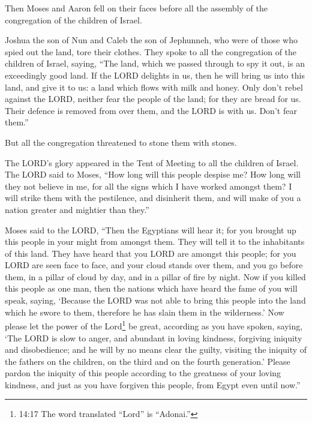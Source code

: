  Then Moses and Aaron fell on their faces before all the
assembly of the congregation of the children of Israel.

 Joshua the son of Nun and Caleb the son of Jephunneh, who
were of those who spied out the land, tore their clothes. 
They spoke to all the congregation of the children of Israel, saying,
``The land, which we passed through to spy it out, is an exceedingly
good land.  If the LORD delights in us, then he will bring
us into this land, and give it to us: a land which flows with milk and
honey.  Only don't rebel against the LORD, neither fear the
people of the land; for they are bread for us. Their defence is removed
from over them, and the LORD is with us. Don't fear them.''

 But all the congregation threatened to stone them with
stones.

The LORD's glory appeared in the Tent of Meeting to all the children of
Israel.  The LORD said to Moses, ``How long will this
people despise me? How long will they not believe in me, for all the
signs which I have worked amongst them?  I will strike them
with the pestilence, and disinherit them, and will make of you a nation
greater and mightier than they.''

 Moses said to the LORD, ``Then the Egyptians will hear it;
for you brought up this people in your might from amongst them.
 They will tell it to the inhabitants of this land. They
have heard that you LORD are amongst this people; for you LORD are seen
face to face, and your cloud stands over them, and you go before them,
in a pillar of cloud by day, and in a pillar of fire by night.
 Now if you killed this people as one man, then the nations
which have heard the fame of you will speak, saying, 
`Because the LORD was not able to bring this people into the land which
he swore to them, therefore he has slain them in the wilderness.'
 Now please let the power of the Lord\footnote{14:17 The
  word translated ``Lord'' is ``Adonai.''} be great, according as you
have spoken, saying,  `The LORD is slow to anger, and
abundant in loving kindness, forgiving iniquity and disobedience; and he
will by no means clear the guilty, visiting the iniquity of the fathers
on the children, on the third and on the fourth generation.'
 Please pardon the iniquity of this people according to the
greatness of your loving kindness, and just as you have forgiven this
people, from Egypt even until now.''

